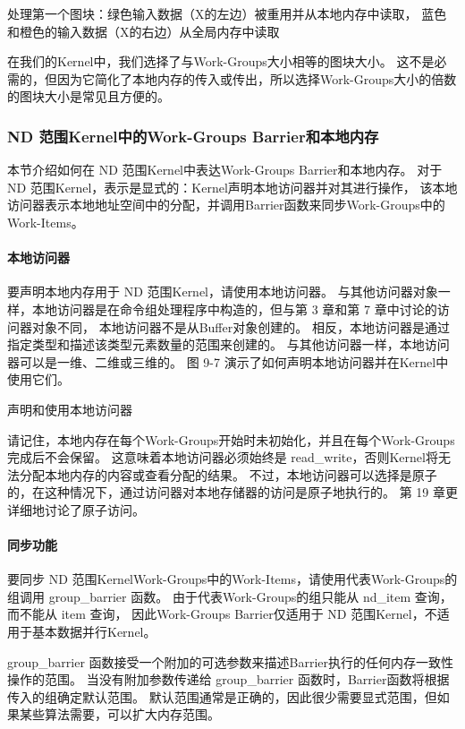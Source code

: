 {\color{red} 处理第一个图块：绿色输入数据（X的左边）被重用并从本地内存中读取，
蓝色和橙色的输入数据（X的右边）从全局内存中读取}

在我们的Kernel中，我们选择了与Work-Groups大小相等的图块大小。 
这不是必需的，但因为它简化了本地内存的传入或传出，所以选择Work-Groups大小的倍数的图块大小是常见且方便的。

\subsubsection{ND 范围Kernel中的Work-Groups Barrier和本地内存}
本节介绍如何在 ND 范围Kernel中表达Work-Groups Barrier和本地内存。 
对于 ND 范围Kernel，表示是显式的：Kernel声明本地访问器并对其进行操作，
该本地访问器表示本地地址空间中的分配，并调用Barrier函数来同步Work-Groups中的Work-Items。

\paragraph{本地访问器}

要声明本地内存用于 ND 范围Kernel，请使用本地访问器。 
与其他访问器对象一样，本地访问器是在命令组处理程序中构造的，但与第 3 章和第 7 章中讨论的访问器对象不同，
本地访问器不是从Buffer对象创建的。 相反，本地访问器是通过指定类型和描述该类型元素数量的范围来创建的。 
与其他访问器一样，本地访问器可以是一维、二维或三维的。 图 9-7 演示了如何声明本地访问器并在Kernel中使用它们。

{\color{red} 声明和使用本地访问器}

请记住，本地内存在每个Work-Groups开始时未初始化，并且在每个Work-Groups完成后不会保留。 
这意味着本地访问器必须始终是 read\_write，否则Kernel将无法分配本地内存的内容或查看分配的结果。 
不过，本地访问器可以选择是原子的，在这种情况下，通过访问器对本地存储器的访问是原子地执行的。 
第 19 章更详细地讨论了原子访问。

\paragraph{同步功能}

要同步 ND 范围KernelWork-Groups中的Work-Items，请使用代表Work-Groups的组调用 group\_barrier 函数。 
由于代表Work-Groups的组只能从 nd\_item 查询，而不能从 item 查询，
因此Work-Groups Barrier仅适用于 ND 范围Kernel，不适用于基本数据并行Kernel。

group\_barrier 函数接受一个附加的可选参数来描述Barrier执行的任何内存一致性操作的范围。 
当没有附加参数传递给 group\_barrier 函数时，Barrier函数将根据传入的组确定默认范围。 
默认范围通常是正确的，因此很少需要显式范围，但如果某些算法需要，可以扩大内存范围。

